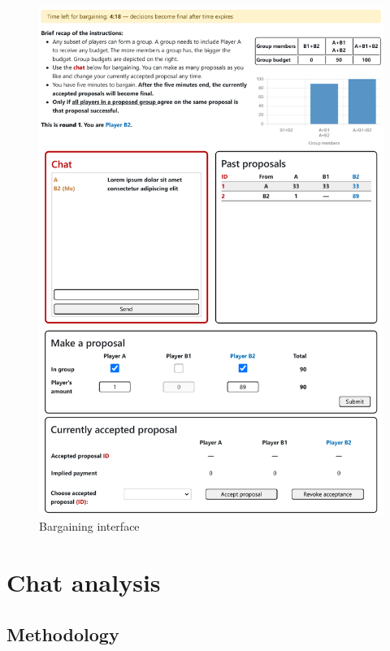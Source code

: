 \documentclass[12pt]{article}
\begin{document}
\begin{figure}[!htb]
    \centering
    \includegraphics[width=.8\linewidth]{screenshots/bargaining_interface.pdf}
    \caption{Bargaining interface}
    \label{bargaining_interface}
\end{figure}


\section{Chat analysis}

\subsection{Methodology}
\label{sec:gpt_prompt}
\end{document}
